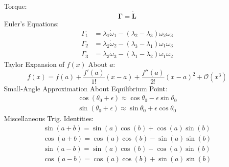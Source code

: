 \documentclass{article}
\renewcommand{\v}[1]{\ensuremath{\mathbf{#1}}} %
\renewcommand{\=}[1]{\stackrel{#1}{=}} %
\begin{document}
\begin{multicols}{4}
		Torque:
		\begin{equation}
			\bm{\Gamma} = \dot{\v{L}}
		\end{equation}
		Euler's Equations:
		\begin{equation} \label{eq1}
			\begin{split}
				\Gamma_1 &= \lambda_1\dot{\omega}_1 - (\lambda_2 - \lambda_3)\omega_2\omega_3 \\
				\Gamma_2 &= \lambda_2\dot{\omega}_2 - (\lambda_3 - \lambda_1)\omega_1\omega_3\\
				\Gamma_3 &= \lambda_3\dot{\omega}_3 - (\lambda_1 - \lambda_2)\omega_1\omega_2
			\end{split}
		\end{equation}
		Taylor Expansion of $f(x)$ About $a$:
		\begin{equation}
			f(x)=f(a)+\frac {f'(a)}{1!} (x-a)+ \frac{f''(a)}{2!} (x-a)^2+\mathcal{O}(x^3)
		\end{equation}
		Small-Angle Approximation About Equilibrium Point:
		\begin{equation} \label{eq1}
			\begin{split}
				\cos(\theta_0+\epsilon)\approx\cos\theta_0-\epsilon\sin\theta_0 \\
				\sin(\theta_0+\epsilon)\approx\sin\theta_0+\epsilon\cos\theta_0
			\end{split}
		\end{equation}
		Miscellaneous Trig. Identities:
		\begin{align}
			\sin(a+b)=\sin(a)\cos(b)+\cos(a)\sin(b) \\
			\cos(a+b)=\cos(a)\cos(b)-\sin(a)\sin(b) \\
			\sin(a-b)=\sin(a)\cos(b)-\cos(a)\sin(b) \\
			\cos(a-b)=\cos(a)\cos(b)+\sin(a)\sin(b)
		\end{align}
	\end{multicols}
\end{document}
